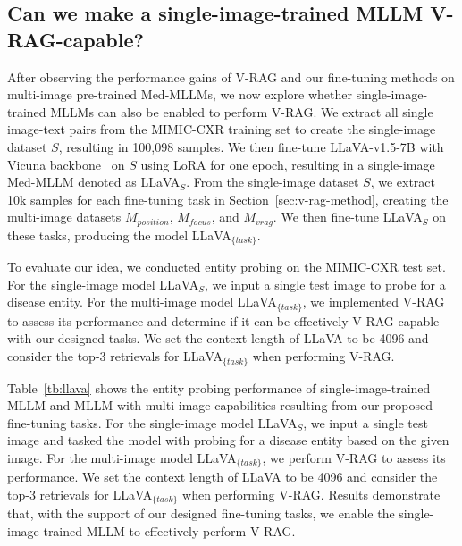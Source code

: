 \subsection{Can we make a single-image-trained MLLM V-RAG-capable?}
After observing the performance gains of V-RAG and our fine-tuning methods on multi-image pre-trained Med-MLLMs, we now explore whether single-image-trained MLLMs can also be enabled to perform V-RAG.
We extract all single image-text pairs from the MIMIC-CXR training set to create the single-image dataset $S$, resulting in 100,098 samples.
We then fine-tune LLaVA-v1.5-7B with Vicuna backbone~\cite{Liu2023ImprovedBW} on $S$ using LoRA for one epoch, resulting in a single-image Med-MLLM denoted as LLaVA$_S$.
From the single-image dataset $S$, we extract 10k samples for each fine-tuning task in Section~\ref{sec:v-rag-method}, creating the multi-image datasets $M_{position}$, $M_{focus}$, and $M_{vrag}$.
We then fine-tune LLaVA$_S$ on these tasks, producing the model LLaVA$_{\{task\}}$.


To evaluate our idea, we conducted entity probing on the MIMIC-CXR test set. For the single-image model LLaVA$_S$, we input a single test image to probe for a disease entity.
For the multi-image model LLaVA$_{\{task\}}$, we implemented V-RAG to assess its performance and determine if it can be effectively V-RAG capable with our designed tasks.
We set the context length of LLaVA to be 4096 and consider the top-3 retrievals for LLaVA$_{\{task\}}$ when performing V-RAG.

Table~\ref{tb:llava} shows the entity probing performance of single-image-trained MLLM and MLLM with multi-image capabilities resulting from our proposed fine-tuning tasks. 
For the single-image model LLaVA$_S$, we input a single test image and tasked the model with probing for a disease entity based on the given image. 
For the multi-image model LLaVA$_{\{task\}}$, we perform V-RAG to assess its performance. We set the context length of LLaVA to be 4096 and consider the top-3 retrievals for LLaVA$_{\{task\}}$ when performing V-RAG.
Results demonstrate that, with the support of our designed fine-tuning tasks, we enable the single-image-trained MLLM to effectively perform V-RAG.


